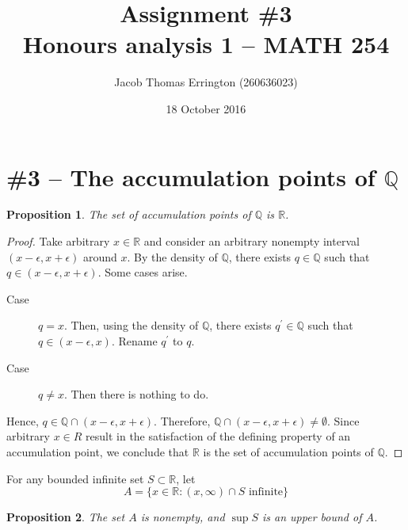 \documentclass[letterpaper,11pt]{article}
\author{Jacob Thomas Errington (260636023)}
\title{Assignment \#3\\Honours analysis 1 -- MATH 254}
\date{18 October 2016}
\newtheorem{prop}{Proposition}
\newcommand{\R}{\mathbb{R}}
\newcommand{\Q}{\mathbb{Q}}
\begin{document}
\maketitle

\section*{\#3 -- The accumulation points of $\Q$}

\begin{prop}
    The set of accumulation points of $\Q$ is $\R$.
\end{prop}

\begin{proof}
    Take arbitrary $x \in \R$ and consider an arbitrary nonempty interval
    $(x - \epsilon, x + \epsilon)$ around $x$. By the density of $\Q$, there
    exists $q \in \Q$ such that $q \in (x - \epsilon, x + \epsilon)$.
    Some cases arise.
    \begin{description}
        \item[Case] $q = x$. Then, using the density of $\Q$, there exists
            $q^\prime \in \Q$ such that $q \in (x - \epsilon, x)$. Rename
            $q^\prime$ to $q$.
        \item[Case] $q \neq x$. Then there is nothing to do.
    \end{description}
    Hence, $q \in \Q \cap (x - \epsilon, x + \epsilon)$. Therefore,
    $\Q \cap (x - \epsilon, x + \epsilon) \neq \emptyset$. Since arbitrary
    $x \in R$ result in the satisfaction of the defining property of an
    accumulation point, we conclude that $\R$ is the set of accumulation points
    of $\Q$.
\end{proof}

For any bounded infinite set $S \subset \R$, let
\begin{equation*}
    A = \{ x \in \R : (x, \infty) \cap S \text{ infinite}\}
\end{equation*}

\begin{prop}
    The set $A$ is nonempty, and $\sup{S}$ is an upper bound of $A$.
\end{prop}
\end{document}
